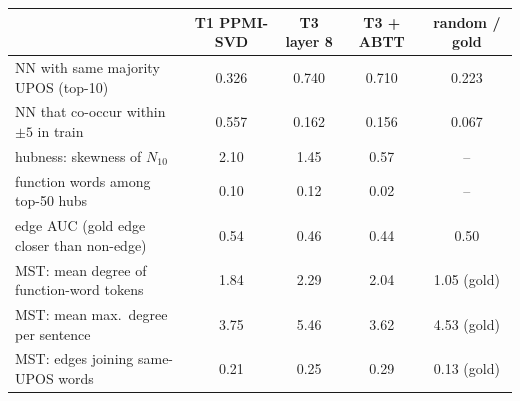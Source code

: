 \begin{tabular}{lcccc}
\toprule
 & T1 PPMI-SVD & T3 layer 8 & T3 + ABTT & random / gold \\
\midrule
NN with same majority UPOS (top-10) & 0.326 & 0.740 & 0.710 & 0.223 \\
NN that co-occur within $\pm5$ in train & 0.557 & 0.162 & 0.156 & 0.067 \\
hubness: skewness of $N_{10}$ & 2.10 & 1.45 & 0.57 & -- \\
function words among top-50 hubs & 0.10 & 0.12 & 0.02 & -- \\
\midrule
edge AUC (gold edge closer than non-edge) & 0.54 & 0.46 & 0.44 & 0.50 \\
MST: mean degree of function-word tokens & 1.84 & 2.29 & 2.04 & 1.05 (gold) \\
MST: mean max.\ degree per sentence & 3.75 & 5.46 & 3.62 & 4.53 (gold) \\
MST: edges joining same-UPOS words & 0.21 & 0.25 & 0.29 & 0.13 (gold) \\
\bottomrule
\end{tabular}
